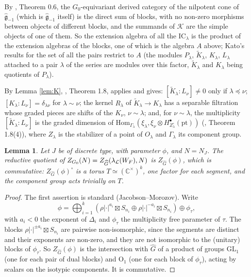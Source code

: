 \documentclass[a4paper,12pt,leqno]{amsart}
\theoremstyle{plain}
\newtheorem{lemma}[thm]{Lemma}
\theoremstyle{definition}
\begin{document}
\noindent By \cite{LY16}, Theorem 0.6, the $G_0$-equivariant derived category of the nilpotent cone of
$\widehat{\mathfrak g}_{-1}$ (which is $\widehat{\mathfrak g}_{-1}$ itself) is the direct sum of blocks, with
no non-zero morphisms between objects of different blocks, and the summands of $\mathcal K$ are the simple
objects of one of them. So the extension algebra of all the $\mathrm{IC}_\lambda$ is the product of the
extension algebras of the blocks, one of which is the algebra $A$ above; Kato's results for the set of
all the pairs restrict to $A$ (the modules $P_\lambda$, $\widetilde K_\lambda$, $K_\lambda$, $L_\lambda$ attached to
a pair $\lambda$ of the series are modules over this factor, $\widetilde K_\lambda$ and $K_\lambda$ being
quotients of $P_\lambda$).

\noindent By Lemma \ref{lem:K}, \cite{Kat17}, Theorem 1.8, applies and gives: $[\widetilde K_\lambda:L_\nu]\neq0$
only if $\lambda\preceq\nu$; $[K_\lambda:L_\nu]=\delta_{\lambda\nu}$ for $\lambda\sim\nu$; the kernel
$R_\lambda$ of $\widetilde K_\lambda\to K_\lambda$ has a separable filtration whose graded pieces are
shifts of the $K_\nu$, $\nu\sim\lambda$; and, for $\nu\sim\lambda$, the multiplicity
$[\widetilde K_\lambda:L_\nu]$ is the graded dimension of
$\mathrm{Hom}_{\Gamma_\lambda}(\xi_\lambda,\xi_\nu\otimes H^\bullet_{Z_\lambda^\circ}(\mathrm{pt}))$ (\cite{Kat17},
Theorem 1.8(4)), where
$Z_\lambda$ is the stabilizer of a point of $O_\lambda$ and $\Gamma_\lambda$ its component
group.

\begin{lemma}\label{lem:compgroup} Let $J$ be of discrete type, with parameter $\phi$, and
$N=N_J$. The reductive quotient of $Z_{G_0}(N)=Z_{\widehat G}(\lambda_{\mathcal{L}}(W_F),N)$ is $Z_{\widehat G}(\phi)$, which is
commutative: $Z_{\widehat G}(\phi)^\circ$ is a torus $T\simeq(\mathbb{C}^\times)^k$, one factor for each
segment, and the component group acts trivially on $T$.
\end{lemma}

\begin{proof}
The first assertion is standard (Jacobson--Morozov). Write
\[\phi=\bigoplus_{i=1}^k(\rho|\cdot|^{a_i}\boxtimes S_{n_i}\oplus\rho|\cdot|^{-a_i}\boxtimes S_{n_i})
\oplus\phi_\tau,\]
with $a_i<0$ the exponent of $\Delta_i$ and $\phi_\tau$ the multiplicity free
parameter of $\tau$. The blocks $\rho|\cdot|^{\pm a_i}\boxtimes S_{n_i}$ are pairwise non-isomorphic,
since the segments are distinct and their exponents are non-zero, and they are not isomorphic to the
(unitary) blocks of $\phi_\tau$. So $Z_{\widehat G}(\phi)$ is the intersection with $\widehat G$ of a
product of groups $\mathrm{GL}_1$ (one for each pair of dual blocks) and $\mathrm{O}_1$ (one for each
block of $\phi_\tau$), acting by scalars on the isotypic components. It is commutative.
\end{proof}
\end{document}
